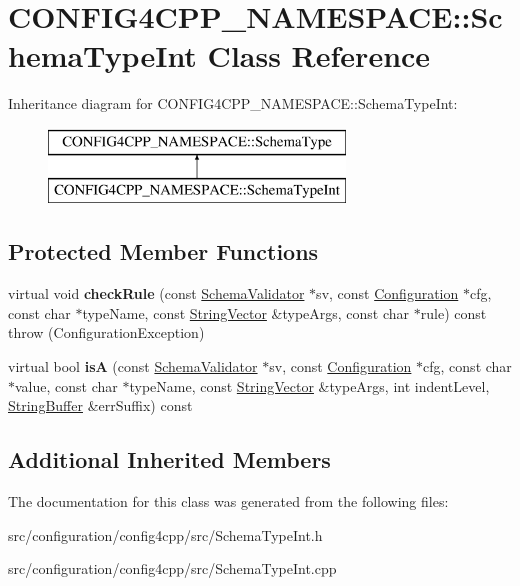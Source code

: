 \hypertarget{classCONFIG4CPP__NAMESPACE_1_1SchemaTypeInt}{\section{C\-O\-N\-F\-I\-G4\-C\-P\-P\-\_\-\-N\-A\-M\-E\-S\-P\-A\-C\-E\-:\-:Schema\-Type\-Int Class Reference}
\label{classCONFIG4CPP__NAMESPACE_1_1SchemaTypeInt}
}
Inheritance diagram for C\-O\-N\-F\-I\-G4\-C\-P\-P\-\_\-\-N\-A\-M\-E\-S\-P\-A\-C\-E\-:\-:Schema\-Type\-Int\-:\begin{figure}[H]
\begin{center}
\leavevmode
\includegraphics[height=2.000000cm]{classCONFIG4CPP__NAMESPACE_1_1SchemaTypeInt}
\end{center}
\end{figure}
\subsection*{Protected Member Functions}
\begin{DoxyCompactItemize}
\item 
\hypertarget{classCONFIG4CPP__NAMESPACE_1_1SchemaTypeInt_a6ebb03588af3cb8a5ae1c386758a3cad}{virtual void {\bfseries check\-Rule} (const \hyperlink{classCONFIG4CPP__NAMESPACE_1_1SchemaValidator}{Schema\-Validator} $\ast$sv, const \hyperlink{classCONFIG4CPP__NAMESPACE_1_1Configuration}{Configuration} $\ast$cfg, const char $\ast$type\-Name, const \hyperlink{classCONFIG4CPP__NAMESPACE_1_1StringVector}{String\-Vector} \&type\-Args, const char $\ast$rule) const   throw (\-Configuration\-Exception)}\label{classCONFIG4CPP__NAMESPACE_1_1SchemaTypeInt_a6ebb03588af3cb8a5ae1c386758a3cad}

\item 
\hypertarget{classCONFIG4CPP__NAMESPACE_1_1SchemaTypeInt_a04f72619cd3865d6d4a0ac12148f5db0}{virtual bool {\bfseries is\-A} (const \hyperlink{classCONFIG4CPP__NAMESPACE_1_1SchemaValidator}{Schema\-Validator} $\ast$sv, const \hyperlink{classCONFIG4CPP__NAMESPACE_1_1Configuration}{Configuration} $\ast$cfg, const char $\ast$value, const char $\ast$type\-Name, const \hyperlink{classCONFIG4CPP__NAMESPACE_1_1StringVector}{String\-Vector} \&type\-Args, int indent\-Level, \hyperlink{classCONFIG4CPP__NAMESPACE_1_1StringBuffer}{String\-Buffer} \&err\-Suffix) const }\label{classCONFIG4CPP__NAMESPACE_1_1SchemaTypeInt_a04f72619cd3865d6d4a0ac12148f5db0}

\end{DoxyCompactItemize}
\subsection*{Additional Inherited Members}


The documentation for this class was generated from the following files\-:\begin{DoxyCompactItemize}
\item 
src/configuration/config4cpp/src/Schema\-Type\-Int.\-h\item 
src/configuration/config4cpp/src/Schema\-Type\-Int.\-cpp\end{DoxyCompactItemize}
